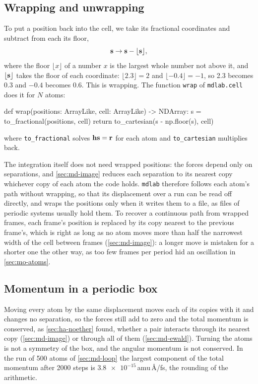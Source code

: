 \subsection*{Wrapping and unwrapping}

To put a position back into the cell, we take its fractional coordinates
and subtract from each its floor,
\begin{equation*}
   \bm{\mathrm{s}} \to \bm{\mathrm{s}} - \lfloor\bm{\mathrm{s}}\rfloor ,
\end{equation*}
where the floor $\lfloor x\rfloor$ of a number $x$ is the largest whole
number not above it, and $\lfloor\bm{\mathrm{s}}\rfloor$ takes the floor of each
coordinate: $\lfloor 2.3\rfloor = 2$ and $\lfloor -0.4\rfloor = -1$, so
2.3 becomes 0.3 and $-0.4$ becomes 0.6.
This is wrapping. The function \texttt{wrap} of \texttt{mdlab.cell} does
it for $N$ atoms:

\begin{code}
def wrap(positions: ArrayLike, cell: ArrayLike) -> NDArray:
    s = to_fractional(positions, cell)
    return to_cartesian(s - np.floor(s), cell)
\end{code}

\noindent where \texttt{to\_fractional} solves $\bm{\mathrm{h}}\bm{\mathrm{s}} = \bm{\mathrm{r}}$
for each atom and \texttt{to\_cartesian} multiplies back.

The integration itself does not need wrapped positions: the forces depend
only on separations, and \cref{sec:md-image} reduces each separation to
its nearest copy whichever copy of each atom the code holds. \texttt{mdlab} therefore follows
each atom's path without wrapping, so that its displacement over a run can
be read off directly, and wraps the positions only when it writes them to
a file, as files of periodic systems usually hold them. To recover a
continuous path from wrapped frames, each frame's position is replaced by
its copy nearest to the previous frame's, which is right as long as no
atom moves more than half the narrowest width of the cell between frames
(\cref{sec:md-image}): a longer move is mistaken for a shorter one the
other way, as too few frames per period hid an oscillation in
\cref{sec:mo-atoms}.

\subsection*{Momentum in a periodic box}

Moving every atom by the same displacement moves each of its copies with
it and changes no separation, so the forces still add to zero and the
total momentum is conserved, as \cref{sec:ha-noether} found, whether a
pair interacts through its nearest copy (\cref{sec:md-image}) or through
all of them (\cref{sec:md-ewald}). Turning the atoms is not
a symmetry of the box, and the angular momentum is not conserved. In the
run of 500 atoms of \cref{sec:md-loop} the largest component of the total
momentum after 2000 steps is $\num{3.8e-15}$\,amu\,\AA/fs, the rounding of
the arithmetic.

